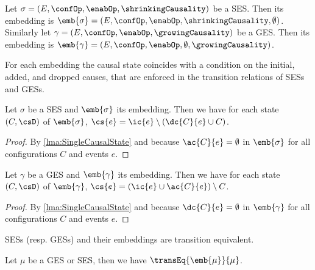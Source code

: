 \documentclass[runningheads,a4paper]{llncs}
\begin{document}
\begin{definition}
\label{def:InclusionIntoDCES}
Let $\sigma=(E,\confOp,\enabOp,\shrinkingCausality)$ be a SES. Then its embedding is $\emb{\sigma}=(E,\confOp,\enabOp,\shrinkingCausality,\emptyset)$. Similarly let $\gamma=(E,\confOp,\enabOp,\growingCausality)$ be a GES. Then its embedding is $\emb{\gamma}=(E,\confOp,\enabOp,\emptyset,\growingCausality)$.
\end{definition}

For each embedding the causal state coincides with a condition on the initial, added, and dropped causes, that are enforced in the transition relations of SESs and GESs.

\begin{lemma}
\label{lma:explicitSEScs}
Let $\sigma$ be a SES and $\emb{\sigma}$ its embedding. Then we have for each state $(C,\csD)$ of $\emb{\sigma}$, $\cs{e}=\ic{e}\setminus(\dc{C}{e}\cup C)$.
\end{lemma}

\begin{proof}
By \lem\ref{lma:SingleCausalState} and because $ \ac{C}{e} = \emptyset $ in $ \emb{\sigma} $ for all configurations $ C $ and events $ e $.
\end{proof}

\begin{lemma}
\label{lma:explicitGEScs}
Let $\gamma$ be a GES and $\emb{\gamma}$ its embedding. Then we have for each state $(C,\csD)$ of $\emb{\gamma}$,  $\cs{e}=(\ic{e}\cup\ac{C}{e})\setminus C$.
\end{lemma}

\begin{proof}
By \lem\ref{lma:SingleCausalState} and because $ \dc{C}{e} = \emptyset $ in $ \emb{\gamma} $ for all configurations $ C $ and events $ e $.
\end{proof}
SESs (resp. GESs) and their embeddings are transition equivalent.
\begin{lemma}
\label{lma:SESinDCES}
\label{lma:GESinDCES}
Let $\mu$ be a GES or SES, then we have $\transEq{\emb{\mu} }{\mu}$.
\end{lemma}
\end{document}
